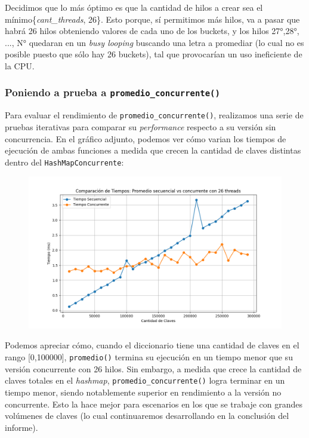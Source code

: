 \documentclass[a4paper]{article}
\begin{document}
    Decidimos que lo más óptimo es que la cantidad de hilos a crear sea el mínimo\{\textit{cant\_threads}, 26\}. Esto porque, sí permitimos más hilos, va a pasar que habrá 26 hilos obteniendo valores de cada uno de los buckets, y los hilos 27°,28°, ..., N° quedaran en un \textit{busy looping} buscando una letra a promediar (lo cual no es posible puesto que sólo hay 26 buckets), tal que provocarían un uso ineficiente de la CPU.

    \subsubsection{Poniendo a prueba a \texttt{promedio\_concurrente()}}

    Para evaluar el rendimiento de \texttt{promedio\_concurrente()}, realizamos una serie de pruebas iterativas para comparar su \textit{performance} respecto a su versión sin concurrencia.
    En el gráfico adjunto, podemos ver cómo varian los tiempos de ejecución de ambas funciones a medida que crecen la cantidad de claves distintas dentro del \texttt{HashMapConcurrente}:

    \begin{figure}[H]
        \centering
        \includegraphics[width=1\textwidth]{codigo/experimentos/comparacion_tiempos.png}
    \end{figure}

    Podemos apreciar cómo, cuando el diccionario tiene una cantidad de claves en el rango [0,100000], \texttt{promedio()} termina su ejecución en un tiempo menor que su versión concurrente con 26 hilos. Sin embargo, a medida que crece la cantidad de claves totales en el \textit{hashmap},  \texttt{promedio\_concurrente()} logra terminar en un tiempo menor, siendo notablemente superior en rendimiento a la versión no concurrente. Esto la hace mejor para escenarios en los que se trabaje con grandes volúmenes de claves (lo cual continuaremos desarrollando en la conclusión del informe).
\end{document}

